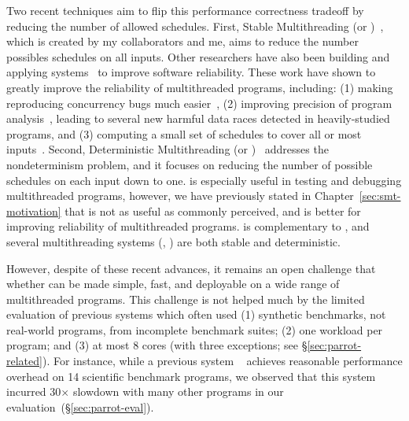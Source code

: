 Two recent techniques aim to flip this performance \vs correctness tradeoff
by reducing the number of allowed schedules. First, Stable Multithreading (or 
\smt)~\cite{determinator:osdi10, cui:tern:osdi10, dthreads:sosp11, 
peregrine:sosp11}, which is created by my collaborators and me, aims to reduce 
the number possibles schedules on all inputs. Other researchers have also been 
building and applying \smt
systems~\cite{determinator:osdi10, dthreads:sosp11, bergan:oopsla13} to improve
software reliability. These work have shown to greatly improve the
reliability of multithreaded programs, including: (1) making reproducing
concurrency bugs much easier~\cite{cui:tern:osdi10, peregrine:sosp11}, (2)
improving precision of program analysis~\cite{peregrine:sosp11, wu:pldi12},
leading to several new harmful data races detected in heavily-studied programs,
and (3) computing a small set of schedules to cover all or most 
inputs~\cite{bergan:oopsla13}. Second, Deterministic Multithreading
(or \dmt)~\cite{dmp:asplos09,kendo:asplos09,coredet:asplos10,
dos:osdi10,grace:oopsla09} addresses the nondeterminism problem, and it focuses
on reducing the number of possible schedules on each input down to one. \dmt is
especially useful in testing and debugging multithreaded programs, however, we
have previously stated in Chapter~\ref{sec:smt-motivation} that \dmt is not as
useful as commonly perceived, and \smt is better for improving reliability of
multithreaded programs. \smt is complementary to \dmt, and several 
multithreading systems (\eg, \cite{determinator:osdi10, dthreads:sosp11, 
cui:tern:osdi10, peregrine:sosp11}) are both stable and deterministic.

However, despite of these recent advances, it remains an
open challenge that whether \smt can be made simple, fast, and 
deployable on a wide range of multithreaded programs.  
This challenge is not helped much by the limited
evaluation of previous systems which often used (1) synthetic benchmarks, not
real-world programs, from incomplete benchmark suites; (2) one workload
per program; and (3) at most 8 cores (with three exceptions; see
\S\ref{sec:parrot-related}). For instance, while a previous
system \dthreads~\cite{dthreads:sosp11} achieves reasonable performance 
overhead on 14 scientific benchmark programs, we observed that
this system incurred 30$\times$ slowdown with many other programs in our
evaluation~(\S\ref{sec:parrot-eval}).

